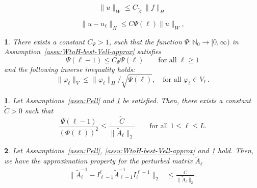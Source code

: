\documentclass[10pt,a4paper]{amsart}
\newtheorem{assumption}{}
\newtheorem{prop}{}
\begin{document}
	\begin{equation}
		\|u\|_{W}  \leq C_{\widetilde{\mathcal{A}}}\,\|f\|_{H}
	\end{equation}

	\begin{equation}
		\|u-u_{\ell}\|_{H}\leq C\Psi(\ell)\|u\|_{W},
              \end{equation}

\begin{assumption}\label{ass:inverse_inequality}
	There exists a constant $C_{\Psi}>1$, such that the function
	$\Psi\colon\mathbb{N}_{0}\to[0,\infty)$ in Assumption~\ref{assu:WtoH-best-Vell-approx} satisfies
	\begin{equation}
		\Psi(\ell-1)\leq C_{\Psi}\Psi(\ell) \qquad\text{for all $\ell\geq1$}
		\label{eqn:inverse_inequality1}
	\end{equation}
	and the following inverse inequality holds:
        \begin{equation}\label{eqn:inverse_inequality2}
          \|\varphi_{\ell}\|_{V}\leq\|\varphi_{\ell}\|_{H}/\sqrt{\Psi(\ell)}, \quad \text{for all $\varphi_{\ell}\in V_{\ell}\,$}.
          \end{equation}
\end{assumption}

\begin{prop}
	\label{prop:1/tildeAll-lb} Let Assumptions~\ref{assu:Pell} and \ref{ass:inverse_inequality} be satisfied. Then, there exists a constant $\tilde{C}>0$ such that 
	\begin{equation}
          \frac{\Psi(\ell-1)}{(\Phi(\ell))^{2}}\leq\frac{\tilde{C}}{\|\widetilde{A}_{\ell}\|_{2}}
          \qquad\text{for all $1\leq \ell\leq L$.}\label{eq:inv-norm-bound}
	\end{equation}
\end{prop}

\begin{prop}
	\label{prop:approximation-property}Let Assumptions~\ref{assu:Pell}, \ref{assu:WtoH-best-Vell-approx} and \ref{ass:inverse_inequality} hold. Then, we have the approximation property for the perturbed matrix $\widetilde{A}_{\ell}$
	\begin{align*}
		\|\widetilde{A}_{\ell}^{-1}-I_{\ell-1}^{\ell}\widetilde{A}_{\ell-1}^{-1}I_{\ell}^{\ell-1}\|_{2}
		 & \leq\frac{C}{\|\widetilde{A}_{\ell}\|_{2}}.
	\end{align*}
\end{prop}
\end{document}
